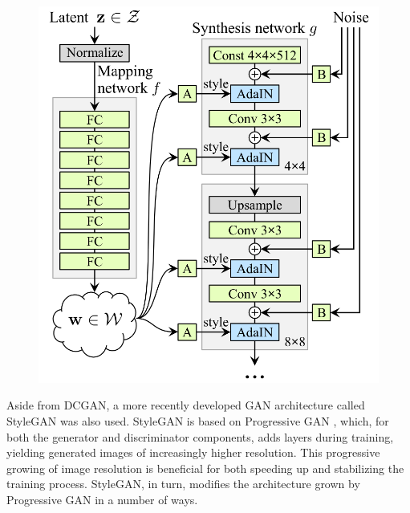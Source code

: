 \documentclass{article}
\begin{document}
\begin{figure}
    \centering
    \includegraphics[width=\linewidth]{report/img/stylegan_architecture.png}
    \label{fig:stylegan_architecture}
\end{figure}

Aside from DCGAN, a more recently developed GAN architecture called StyleGAN \cite{karras2019stylebased} was also used. StyleGAN is based on Progressive GAN \cite{karras2018progressive}, which, for both the generator and discriminator components, adds layers during training, yielding generated images of increasingly higher resolution. This progressive growing of image resolution is beneficial for both speeding up and stabilizing the training process. StyleGAN, in turn, modifies the architecture grown by Progressive GAN in a number of ways. 
\end{document}
